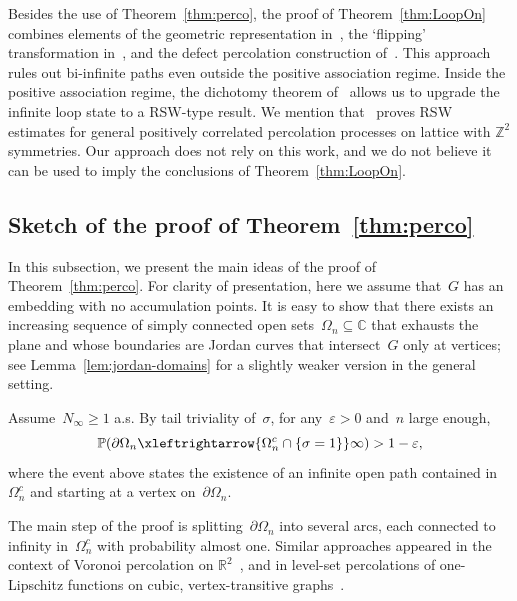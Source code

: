 \documentclass[11pt,letterpaper]{amsart}
\newcounter{n}
\numberwithin{n}{section}
\theoremstyle{plain}
\theoremstyle{definition}
\theoremstyle{remark}
\newcommand\C{\mathbb C}
\renewcommand\P{\mathbb P}
\newcommand\Z{\mathbb Z}
\newcommand\domain\Omega
\newcommand{\xlra}{\xleftrightarrow} %
\newcommand{\1}{\mathbbm{1}}
\renewcommand\subset\subseteq
\begin{document}
Besides the use of Theorem~\ref{thm:perco}, the proof of Theorem~\ref{thm:LoopOn} combines elements of the geometric representation in~\cite{GlaLam25}, the `flipping' transformation in~\cite{GlaMan21}, and the defect percolation construction of~\cite{CraGlaHarPel25}. This approach rules out bi-infinite paths even outside the positive association regime. Inside the positive association regime, the dichotomy theorem of~\cite{DumGlaPel21} allows us to upgrade the infinite loop state to a RSW-type result. We mention that~\cite{KohTas23} proves RSW estimates for general positively correlated percolation processes on lattice with $\Z^2$ symmetries. Our approach does not rely on this work, and we do not believe it can be used to imply the conclusions of Theorem~\ref{thm:LoopOn}.


\subsection{Sketch of the proof of Theorem~\ref{thm:perco}}
\label{sec:sketch}

In this subsection, we present the main ideas of the proof of Theorem~\ref{thm:perco}.
For clarity of presentation, here we assume that~$G$ has an embedding with no accumulation points.
It is easy to show that there exists an increasing sequence of simply connected open sets~$\domain_n\subset\C$ that exhausts the plane and whose boundaries are Jordan curves that intersect~$G$ only at vertices; see Lemma~\ref{lem:jordan-domains} for a slightly weaker version in the general setting.

Assume~$N_\infty\geq 1$ a.s.
By tail triviality of~$\sigma$, for any~$\varepsilon>0$ and~$n$ large enough,
\begin{equation}\label{eq:one-arm}
	\P(\partial\domain_n\xlra{\domain_n^c\cap \{\sigma=1\}} \infty) > 1-\varepsilon,
\end{equation}
where the event above states the existence of an infinite open path contained in~$\domain_n^c$ and starting at a vertex on~$\partial\domain_n$.

The main step of the proof is splitting~$\partial\domain_n$ into several arcs, each connected to infinity in~$\domain_n^c$ with probability almost one. Similar approaches appeared in the context of Voronoi percolation on $\mathbb{R}^2$~\cite{Tas16}, and in level-set percolations of one-Lipschitz functions on cubic, vertex-transitive graphs~\cite{Kar23}.
\end{document}
